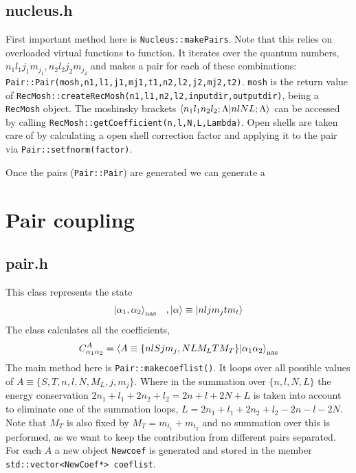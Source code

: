 \documentclass[10pt]{article}
\begin{document}
\subsection{nucleus.h}
First important method here is \texttt{Nucleus::makePairs}. Note that this relies on overloaded virtual functions to function. It iterates over the quantum numbers, $n_1 l_1 j_1 m_{j_1}, n_2 l_2 j_2 m_{j_2}$ and makes a pair for each of these combinations: \texttt{Pair::Pair(mosh,n1,l1,j1,mj1,t1,n2,l2,j2,mj2,t2)}. \texttt{mosh} is the return value of \texttt{RecMosh::createRecMosh(n1,l1,n2,l2,inputdir,outputdir)}, being a \texttt{RecMosh} object. The moshinsky brackets $\braket{n_1 l_1 n_2 l_2; \Lambda | n l N L ; \Lambda}$ can be accessed by calling \texttt{RecMosh::getCoefficient(n,l,N,L,Lambda)}.
Open shells are taken care of by calculating a open shell correction factor and applying it to the pair via \texttt{Pair::setfnorm(factor)}.

Once the pairs (\texttt{Pair::Pair}) are generated we can generate a 



\section{Pair coupling}
\subsection{pair.h}
This class represents the state
\begin{align}
	\ket{ \alpha_1, \alpha_2}_{\textrm{nas}} \;\;\;, \ket{\alpha} \equiv \ket{n l j m_j t m_t}
\end{align}
The class calculates all the coefficients,
\begin{align}
	C_{\alpha_1 \alpha_2}^{A} = \braket{A \equiv \{ n l S j m_j, N L M_L T M_T\} | \alpha_1 \alpha_2}_{\text{nas}}
	\label{eq:coef}
\end{align}
The main method here is \texttt{Pair::makecoeflist()}. It loops over all 
possible values of $ A \equiv \{ S,T,n,l,N,M_L,j,m_j \}$. Where in the 
summation over $\{n,l,N,L\}$ the energy conservation $2n_1 + l_1 + 2n_2 + l_2 = 
2n + l + 2N + L$ is taken into account to eliminate one of the summation loops, 
$L = 2n_1 + l_1 + 2n_2 + l_2 - 2n - l - 2N$. Note that $M_T$ is also fixed by 
$M_T = m_{t_1} + m_{t_2}$ and no summation over this is performed, as we want to 
keep the contribution from different pairs separated.
For each $A$ a new object \texttt{Newcoef} is generated and stored in the member \texttt{std::vector<NewCoef*> coeflist}.
\end{document}
